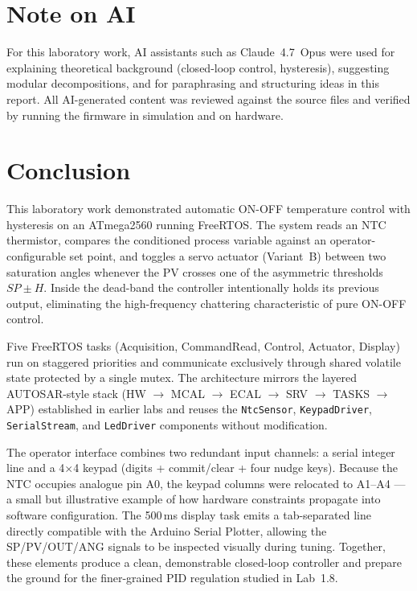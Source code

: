 \documentclass[12pt]{article}
\begin{document}
\section{Note on AI}

\hspace{0.8cm}
For this laboratory work, AI assistants such as Claude~4.7~Opus were used for explaining theoretical background (closed-loop control, hysteresis), suggesting modular decompositions, and for paraphrasing and structuring ideas in this report. All AI-generated content was reviewed against the source files and verified by running the firmware in simulation and on hardware.

\section{Conclusion}

\hspace{0.8cm}
This laboratory work demonstrated automatic ON-OFF temperature control with hysteresis on an ATmega2560 running FreeRTOS. The system reads an NTC thermistor, compares the conditioned process variable against an operator-configurable set point, and toggles a servo actuator (Variant~B) between two saturation angles whenever the PV crosses one of the asymmetric thresholds $SP\!\pm\!H$. Inside the dead-band the controller intentionally holds its previous output, eliminating the high-frequency chattering characteristic of pure ON-OFF control.

\hspace{0.8cm}
Five FreeRTOS tasks (Acquisition, CommandRead, Control, Actuator, Display) run on staggered priorities and communicate exclusively through shared volatile state protected by a single mutex. The architecture mirrors the layered AUTOSAR-style stack (HW $\to$ MCAL $\to$ ECAL $\to$ SRV $\to$ TASKS $\to$ APP) established in earlier labs and reuses the \texttt{NtcSensor}, \texttt{KeypadDriver}, \texttt{SerialStream}, and \texttt{LedDriver} components without modification.

\hspace{0.8cm}
The operator interface combines two redundant input channels: a serial integer line and a 4$\times$4 keypad (digits + commit/clear + four nudge keys). Because the NTC occupies analogue pin A0, the keypad columns were relocated to A1--A4 --- a small but illustrative example of how hardware constraints propagate into software configuration. The 500\,ms display task emits a tab-separated line directly compatible with the Arduino Serial Plotter, allowing the SP/PV/OUT/ANG signals to be inspected visually during tuning. Together, these elements produce a clean, demonstrable closed-loop controller and prepare the ground for the finer-grained PID regulation studied in Lab~1.8.
\end{document}
